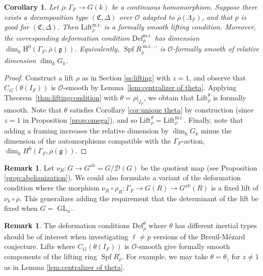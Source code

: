 \documentclass[11pt, letterpaper,english]{amsart}
\theoremstyle{plain}
\newtheorem{corollary}[lem]{Corollary}
\theoremstyle{definition}
\newtheorem{remark}[lem]{Remark}
\numberwithin{equation}{section}
\numberwithin{lem}{section}
\newcommand{\fC}{\mathfrak{C}}
\newcommand{\fg}{\mathfrak{g}}
\newcommand{\cO}{\mathcal{O}}
\newcommand{\sD}{{\mathscr D}}
\newcommand{\rhobar}{{\overline{\rho}}}
\newcommand{\gma}[1]{\Gamma_{#1}}
\DeclareMathOperator{\Spf}{Spf}
\DeclareMathOperator{\GL}{GL}
\newcommand{\cent}[2]{C_{#1}(#2)}
\DeclareMathOperator{\mr}{m.r.}
\renewcommand{\mr}{\operatorname{m.r.}}
\begin{document}
\begin{corollary}  \label{cor:liftingcondition}
Let $\rhobar : \Gamma_F \to G(k)$ be a continuous homomorphism.  Suppose there exists a decomposition type $(\fC,\Delta)$ over $\cO$ adapted to $\rhobar(\Lambda_F)$, and that $p$ is good for $(\fC,\Delta)$.
Then $\mathrm{Lift}_{\rhobar}^{\mr}$ is a formally smooth lifting condition. Moreover, the corresponding deformation condition
$\mathrm{Def}_{\rhobar}^{\mr}$ has dimension $\dim_{k} \mathrm{H}^0(\gma{F}, \rhobar(\fg))$.  Equivalently, $\Spf R^{\mr,\square}_{\rhobar}$ is $\cO$-formally smooth of relative dimension $\dim_k G_k$.
\end{corollary}

\begin{proof}
Construct a lift $\rho$ as in Section \ref{ss:lifting} with $z=1$, and observe that $\cent{G}{\theta(I_F)}$ is $\cO$-smooth by Lemma~\ref{lem:centralizer of theta}.  
Applying Theorem~\ref{thm:liftingcondition} with $\theta=\rho|_{I_F}$, we obtain that $\mathrm{Lift}_{\rhobar}^{\theta}$ is formally smooth. Note that $\theta$ satisfies Corollary \ref{cor:unique theta} by construction (since $z=1$ in Proposition \ref{prop:omega}), and so $\mathrm{Lift}_{\rhobar}^{\theta}=\mathrm{Lift}_{\rhobar}^{\mr}$. 
Finally, note that adding a framing increases the relative dimension by $\dim_k G_k$ minus the dimension of the automorphisms compatible with the $\Gamma_F$-action, $\dim_k H^0(\Gamma_F,\rhobar(\fg))$.
\end{proof}


\begin{remark}
Let $\nu_R : G \to G^{\mathrm{ab}}=G/\sD(G)$ be the quotient map (see Proposition \ref{prop:abelianization}).
We could also formulate a variant of the deformation condition where the morphism $\nu_R \circ \rho_R : \Gamma_F \to G(R) \to G^{\mathrm{ab}}(R)$ is a fixed lift of $\nu_k \circ \rhobar$.
This generalizes adding the requirement that the determinant of the lift be fixed when $G = \GL_n$.
\end{remark}

\begin{remark}
The deformation conditions $\mathrm{Def}_{\rhobar}^{\theta}$ where $\theta$ has different inertial types should be of interest when investigating $\ell \neq p$ versions of the Breuil-M\'{e}zard conjecture. Lifts where $C_G(\theta(I_F))$ is $\cO$-smooth give formally smooth components of the lifting ring $\Spf R^{\square}_{\rhobar}$.
For example, we may take $\theta=\theta_z$ for $z \neq 1$ as in Lemma \ref{lem:centralizer of theta}. 
\end{remark}
\end{document}
